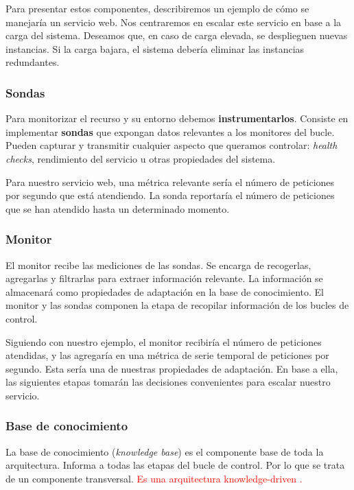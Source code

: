 Para presentar estos componentes, describiremos un ejemplo de cómo se manejaría un servicio web. Nos centraremos en escalar este servicio en base a la carga del sistema. Deseamos que, en caso de carga elevada, se desplieguen nuevas instancias. Si la carga bajara, el sistema debería eliminar las instancias redundantes.

\subsubsection{Sondas}

Para monitorizar el recurso y su entorno debemos \textbf{instrumentarlos}. Consiste en implementar \textbf{sondas} que expongan datos relevantes a los monitores del bucle. Pueden capturar y transmitir cualquier aspecto que queramos controlar: \emph{health checks}, rendimiento del servicio u otras propiedades del sistema.

Para nuestro servicio web, una métrica relevante sería el número de peticiones por segundo que está atendiendo. La sonda reportaría el número de peticiones que se han atendido hasta un determinado momento.

\subsubsection{Monitor}

El monitor recibe las mediciones de las sondas. Se encarga de recogerlas, agregarlas y filtrarlas para extraer información relevante. La información se almacenará como propiedades de adaptación en la base de conocimiento.\cite{fonsEspecificacionSistemasAutoadaptativos2021} El monitor y las sondas componen la etapa de recopilar información de los bucles de control.

Siguiendo con nuestro ejemplo, el monitor recibiría el número de peticiones atendidas, y las agregaría en una métrica de serie temporal de peticiones por segundo. Esta sería una de nuestras propiedades de adaptación. En base a ella, las siguientes etapas tomarán las decisiones convenientes para escalar nuestro servicio.

\subsubsection{Base de conocimiento}

La base de conocimiento (\emph{knowledge base}) es el componente base de toda la arquitectura. Informa a todas las etapas del bucle de control. Por lo que se trata de un componente transversal. \textcolor{red}{Es una arquitectura knowledge-driven \cite{taylorSoftwareArchitectureFoundations2009}.}

